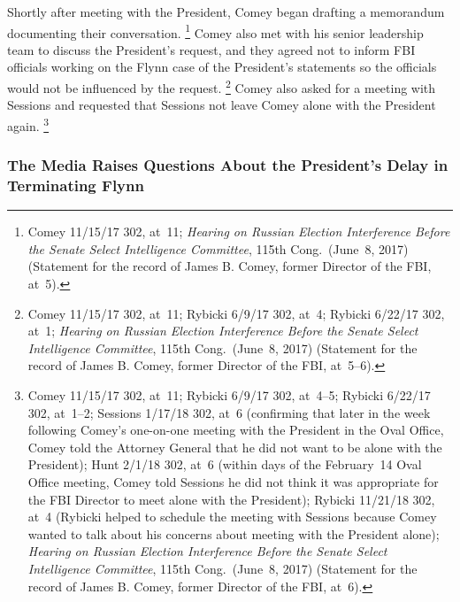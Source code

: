 Shortly after meeting with the President, Comey began drafting a memorandum documenting their conversation.%
\footnote{Comey 11/15/17 302, at~11;
\textit{Hearing on Russian Election Interference Before the Senate Select Intelligence Committee}, 115th Cong.\ (June~8, 2017) (Statement for the record of James B. Comey, former Director of the FBI, at~5).}
Comey also met with his senior leadership team to discuss the President's request, and they agreed not to inform FBI officials working on the Flynn case of the President's statements so the officials would not be influenced by the request.%
\footnote{Comey 11/15/17 302, at~11;
Rybicki 6/9/17 302, at~4;
Rybicki 6/22/17 302, at~1;
\textit{Hearing on Russian Election Interference Before the Senate Select Intelligence Committee}, 115th Cong.\ (June~8, 2017) (Statement for the record of James B. Comey, former Director of the FBI, at~5--6).}
Comey also asked for a meeting with Sessions and requested that Sessions not leave Comey alone with the President again.%
\footnote{Comey 11/15/17 302, at~11;
Rybicki 6/9/17 302, at~4--5;
Rybicki 6/22/17 302, at~1--2;
Sessions 1/17/18 302, at~6 (confirming that later in the week following Comey's one-on-one meeting with the President in the Oval Office, Comey told the Attorney General that he did not want to be alone with the President);
Hunt 2/1/18 302, at~6 (within days of the February~14 Oval Office meeting, Comey told Sessions he did not think it was appropriate for the FBI Director to meet alone with the President);
Rybicki 11/21/18 302, at~4 (Rybicki helped to schedule the meeting with Sessions because Comey wanted to talk about his concerns about meeting with the President alone);
\textit{Hearing on Russian Election Interference Before the Senate Select Intelligence Committee}, 115th Cong.\ (June~8, 2017) (Statement for the record of James B. Comey, former Director of the FBI, at~6).}

\subsubsection{The Media Raises Questions About the President's Delay in Terminating Flynn}


